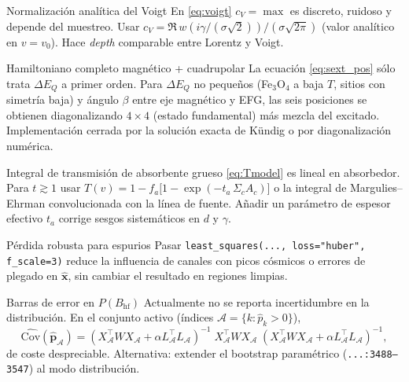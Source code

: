 \documentclass[11pt,a4paper]{article}
\newcommand{\BHF}{B_{\mathrm{hf}}}
\newcommand{\dEQ}{\Delta E_{Q}}
\newcommand{\code}[1]{\texttt{\small #1}}
\newcommand{\file}[1]{\textcolor{black!70}{\texttt{\small #1}}}
\begin{document}
\begin{mejora}{Normalización analítica del Voigt}\label{mej:voigt}
En \eqref{eq:voigt} $c_V=\max$ es discreto, ruidoso y depende del muestreo. Usar $c_V = \Re\,w(i\gamma/(\sigma\sqrt 2))/(\sigma\sqrt{2\pi})$ (valor analítico en $v=v_0$). Hace \emph{depth} comparable entre Lorentz y Voigt.
\end{mejora}

\begin{mejora}{Hamiltoniano completo magnético + cuadrupolar}\label{mej:ham}
La ecuación \eqref{eq:sext_pos} sólo trata $\dEQ$ a primer orden. Para $\dEQ$ no pequeños (Fe$_3$O$_4$ a baja $T$, sitios con simetría baja) y ángulo $\beta$ entre eje magnético y EFG, las seis posiciones se obtienen diagonalizando $4\times 4$ (estado fundamental) más mezcla del excitado. Implementación cerrada por la solución exacta de Kündig o por diagonalización numérica.
\end{mejora}

\begin{mejora}{Integral de transmisión de absorbente grueso}\label{mej:thickness}
\eqref{eq:Tmodel} es lineal en absorbedor. Para $t \gtrsim 1$ usar
\(T(v) = 1 - f_a\bigl[1 - \exp(-t_a\,\Sigma_c A_c)\bigr]\)
o la integral de Margulies--Ehrman convolucionada con la línea de fuente. Añadir un parámetro de espesor efectivo $t_a$ corrige sesgos sistemáticos en $d$ y $\gamma$.
\end{mejora}

\begin{mejora}{Pérdida robusta para espurios}\label{mej:robust}
Pasar \code{least\_squares(..., loss="huber", f\_scale=3)} reduce la influencia de canales con picos cósmicos o errores de plegado en $\hat{\bm x}$, sin cambiar el resultado en regiones limpias.
\end{mejora}

\begin{mejora}{Barras de error en $P(\BHF)$}\label{mej:perr}
Actualmente no se reporta incertidumbre en la distribución. En el conjunto activo (índices $\mathcal A=\{k:\hat p_k>0\}$),
\[
  \widehat{\mathrm{Cov}}(\hat{\bm p}_{\mathcal A}) = (X_{\mathcal A}^\top W X_{\mathcal A}+\alpha L_{\mathcal A}^\top L_{\mathcal A})^{-1}
  \;X_{\mathcal A}^\top W X_{\mathcal A}\;(X_{\mathcal A}^\top W X_{\mathcal A}+\alpha L_{\mathcal A}^\top L_{\mathcal A})^{-1},
\]
de coste despreciable. Alternativa: extender el bootstrap paramétrico (\file{...:3488--3547}) al modo distribución.
\end{mejora}
\end{document}
